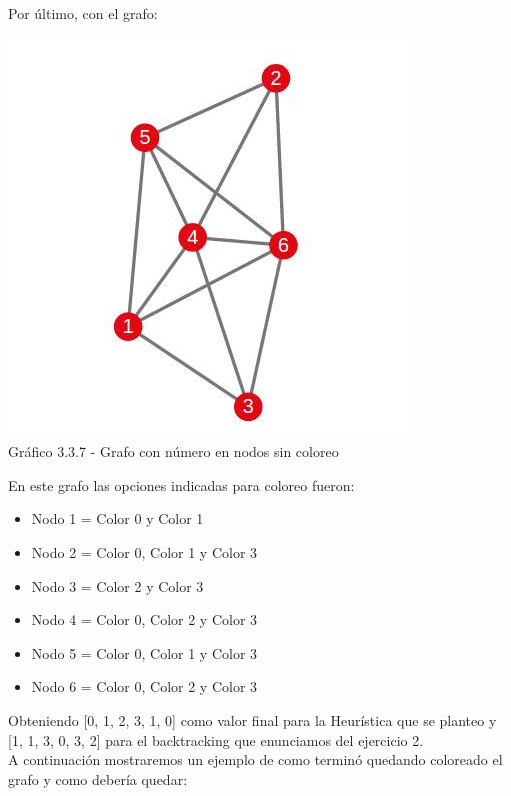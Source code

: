    
Por último, con el grafo:\\

\vspace*{0.3cm} \vspace*{0.3cm}
  \begin{center}
 \includegraphics[scale=0.5]{./ej3/parte3/grafo3.jpg}
 	{\\Gráfico 3.3.7 - Grafo con número en nodos sin coloreo}
  \end{center}
  \vspace*{0.3cm}
  
En este grafo las opciones indicadas para coloreo fueron:\\
\begin{itemize}
\item Nodo 1 = Color 0 y Color 1
\item Nodo 2 = Color 0, Color 1 y Color 3
\item Nodo 3 = Color 2 y Color 3
\item Nodo 4 = Color 0, Color 2 y Color 3
\item Nodo 5 = Color 0, Color 1 y Color 3
\item Nodo 6 = Color 0, Color 2 y Color 3
\end{itemize}

Obteniendo [0, 1, 2, 3, 1, 0] como valor final para la Heurística que se planteo y [1, 1, 3, 0, 3, 2] para el backtracking que enunciamos del ejercicio 2.\\

A continuación mostraremos un ejemplo de como terminó quedando coloreado el grafo y como debería quedar:\\

